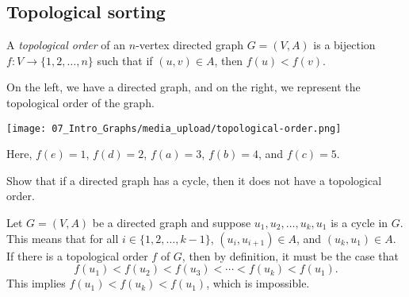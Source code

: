 \subsection{Topological sorting}
\label{sec:intro-to-graph-theory::topological-sorting}

\begin{flex}
\label{grp:def:intro-to-graph-theory::topological-order-of-a-directed-graph}

\begin{definition}
\label{def:intro-to-graph-theory::topological-order-of-a-directed-graph}
A \emph{topological order} of an $n$-vertex directed graph $G = (V,A)$ is a bijection $f: V \to \{1,2,\ldots,n\}$ such that if $(u,v) \in A$, then $f(u) < f(v)$. 

\end{definition}

\begin{example}
\label{xmpl:intro-to-graph-theory::example-of-topological-order}
On the left, we have a directed graph, and on the right, we represent the topological order of the graph. 
\begin{center}
    \texttt{[image: 07\_Intro\_Graphs/media\_upload/topological-order.png]}
\end{center}
Here, $f(e) = 1$, $f(d) = 2$, $f(a) = 3$, $f(b) = 4$, and $f(c) = 5$.

\end{example}
\end{flex}

\begin{flex}
\label{grp:xrcs:intro-to-graph-theory::cycle-implies-no-topological-order}

\begin{exercise}
\label{xrcs:intro-to-graph-theory::cycle-implies-no-topological-order}
Show that if a directed graph has a cycle, then it does not have a topological order.

\end{exercise}

\begin{solution}
\label{sol:intro-to-graph-theory::directed}
Let $G=(V,A)$ be a directed graph and suppose $u_1,u_2,\ldots,u_k,u_1$ is a cycle in $G$. This means that for all $i \in \{1,2,\ldots,k-1\}$, $(u_i,u_{i+1}) \in A$, and $(u_k,u_1) \in A$. If there is a topological order $f$ of $G$, then by definition, it must be the case that
\[
f(u_1) < f(u_2) < f(u_3) < \cdots < f(u_k) < f(u_1).
\]
This implies $f(u_1) < f(u_k) < f(u_1)$, which is impossible.

\end{solution}
\end{flex}

